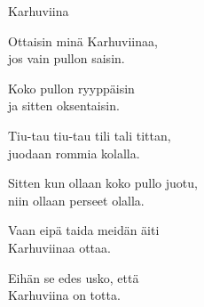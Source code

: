 \begin{song}{Karhuviina}

    Ottaisin minä Karhuviinaa,\\
    jos vain pullon saisin.\\
    \begin{repetition}
        Koko pullon ryyppäisin\\
        ja sitten oksentaisin.
    \end{repetition}

    Tiu-tau tiu-tau tili tali tittan,\\
    juodaan rommia kolalla.\\
    \begin{repetition}
        Sitten kun ollaan koko pullo juotu,\\
        niin ollaan perseet olalla.
    \end{repetition}

    Vaan eipä taida meidän äiti\\
    Karhuviinaa ottaa.

    \begin{repetition}
        Eihän se edes usko, että\\
        Karhuviina on totta.
    \end{repetition}

\end{song}